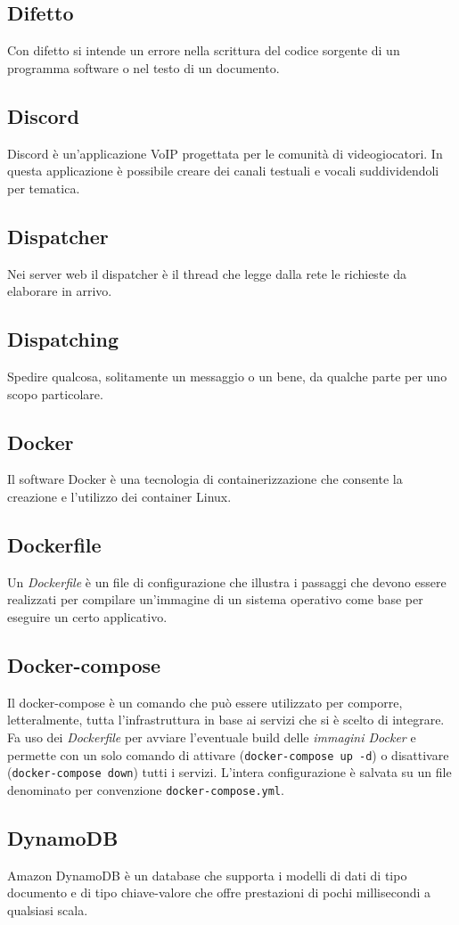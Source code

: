 \subsection{Difetto}  Con difetto si intende un errore nella scrittura del codice sorgente di un programma software o nel testo di un documento.
\subsection{Discord}  Discord è un'applicazione VoIP progettata per le comunità di videogiocatori. In questa applicazione è possibile creare dei canali testuali e vocali suddividendoli per tematica. 
\subsection{Dispatcher}  Nei server web il dispatcher è il thread che legge dalla rete le richieste da elaborare in arrivo.
\subsection{Dispatching}  Spedire qualcosa, solitamente un messaggio o un bene, da qualche parte per uno scopo particolare.
\subsection{Docker}  Il software Docker è una tecnologia di containerizzazione che consente la creazione e l'utilizzo dei container Linux.
\subsection{Dockerfile}  Un \textit{Dockerfile} è un file di configurazione che illustra i passaggi che devono essere realizzati per compilare un'immagine di un sistema operativo come base per eseguire un certo applicativo.
\subsection{Docker-compose}  Il docker-compose è un comando che può essere utilizzato per comporre, letteralmente, tutta l'infrastruttura in base ai servizi che si è scelto di integrare. Fa uso dei \textit{Dockerfile} per avviare l'eventuale build delle \textit{immagini Docker} e permette con un solo comando di attivare (\verb!docker-compose up -d!) o disattivare (\verb!docker-compose down!) tutti i servizi. L'intera configurazione è salvata su un file denominato per convenzione \verb!docker-compose.yml!.
\subsection{DynamoDB}  Amazon DynamoDB è un database che supporta i modelli di dati di tipo documento e di tipo chiave-valore che offre prestazioni di pochi millisecondi a qualsiasi scala.


